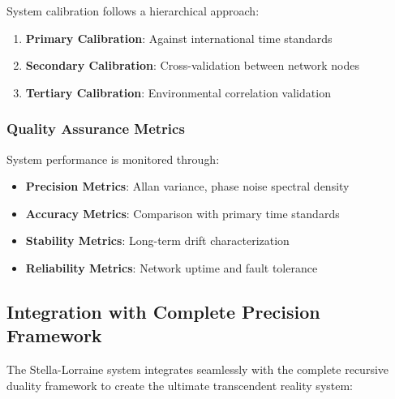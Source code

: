 \documentclass[12pt,a4paper]{article}
\begin{document}
{System calibration follows a hierarchical approach:

\begin{enumerate}
\item \textbf{Primary Calibration}: Against international time standards
\item \textbf{Secondary Calibration}: Cross-validation between network nodes
\item \textbf{Tertiary Calibration}: Environmental correlation validation
\end{enumerate}

\subsubsection{Quality Assurance Metrics}

System performance is monitored through:

\begin{itemize}
\item \textbf{Precision Metrics}: Allan variance, phase noise spectral density
\item \textbf{Accuracy Metrics}: Comparison with primary time standards
\item \textbf{Stability Metrics}: Long-term drift characterization
\item \textbf{Reliability Metrics}: Network uptime and fault tolerance
\end{itemize}

\subsection{Integration with Complete Precision Framework}

The Stella-Lorraine system integrates seamlessly with the complete recursive duality framework to create the ultimate transcendent reality system:

\begin{figure}[H]
\centering
{}
\end{figure}}
\end{document}
